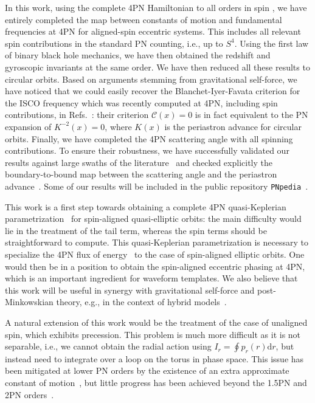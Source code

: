 \documentclass[prd,superscriptaddress,preprintnumbers,tightenlines,nofootinbib, eqsecnum]{revtex4-2}
\renewcommand{\dd}{\mathrm{d}}
\begin{document}
In this work, using the complete 4PN Hamiltonian to all orders in spin \cite{Levi:2016ofk},  we have entirely completed the map between constants of motion and fundamental frequencies at 4PN for aligned-spin eccentric systems. This includes all relevant spin contributions in the standard PN counting, i.e., up to $S^4$. Using the first law of binary black hole mechanics, we have then obtained the redshift and gyroscopic invariants at the same order. We have then reduced all these results to circular orbits. Based on arguments stemming from gravitational self-force, we have noticed that we could easily recover the Blanchet-Iyer-Favata criterion for the ISCO frequency which was recently computed at 4PN, including spin contributions, in Refs.~\cite{Blanchet:2025agj,Blanchet:2026wwa}: their criterion $\mathcal{C}(x)=0$ is in fact equivalent to the PN expansion of   $K^{-2}(x)=0$, where $K(x)$ is the periastron advance for circular orbits. Finally, we have completed the 4PN scattering angle with all spinning contributions. To ensure their robustness, we have successfully validated our results against large swaths of the literature~\cite{Henry:2023tka,
Bini:2019lcd,
Bini:2020zqy,
Bautista:2024agp,
Cho:2022syn,
Marsat:2014xea,
Siemonsen:2017yux,
Bini:2017wfr,
Khalil:2021fpm,
Blanchet:2025agj,
Blanchet:2026wwa,
LeTiec:2013uey} and checked explicitly the  boundary-to-bound map between the scattering angle and the periastron advance~\cite{Kalin:2019inp}. Some of our results will be included in the public repository \texttt{PNpedia}~\cite{PNpedia}.

This work is a first step towards obtaining a complete 4PN quasi-Keplerian parametrization~\cite{DamourDeruelle86, Schafer:1993pkg,Wex:1995pjg,Memmesheimer:2004cv, Tessmer:2012xr, Cho:2021oai,Henry:2023tka} for spin-aligned quasi-elliptic orbits:  the main difficulty would lie in the treatment of the tail term, whereas the spin terms should be straightforward to compute. This quasi-Keplerian parametrization is necessary to specialize the 4PN flux of energy~\cite{Blanchet:2023bwj,Blanchet:2023sbv,Cho:2022syn,Marsat:2014xea,Siemonsen:2017yux} to the case of spin-aligned elliptic orbits. One would then be in a position to obtain the spin-aligned eccentric phasing at 4PN, which is an important ingredient for waveform templates. We also believe that this work will be useful in synergy with gravitational self-force and post-Minkowskian theory, e.g., in the context of hybrid models~\cite{Honet:2025gge,Honet:2025lmk,Warburton:2025ymy}.

A natural extension of this work would be the treatment of the case of unaligned spin, which exhibits precession. This problem is much more difficult as it is not separable, i.e., we cannot obtain the radial action using $I_r = \oint p_r(r) \dd r$, but instead need to integrate over a loop on the torus in phase space. This issue has been mitigated at lower PN orders by the existence of an extra approximate constant of motion~\cite{Racine:2008qv}, but little progress has been achieved beyond the 1.5PN and 2PN orders~\cite{Klein:2021jtd,Samanta:2022yfe,Witzany:2024ttz,Morras:2025nlp,Colin:2026iry}.
\end{document}
